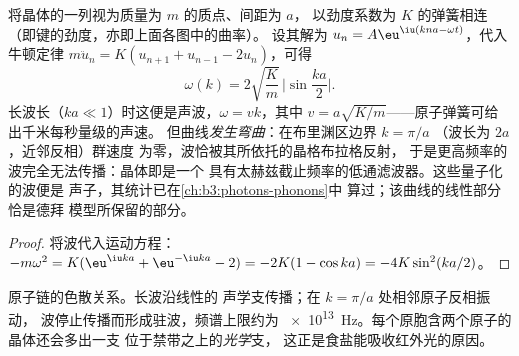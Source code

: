 \begin{theorem}[单原子链的色散]\label{thm:b3:crystalline-solids:dispersion}
将晶体的一列视为质量为 $m$ 的质点、间距为 $a$，
以劲度系数为 $K$ 的弹簧相连（即键的劲度，亦即上面各图中的曲率）。
设其解为 $u_n = A\eu^{\iu(kna - \omega t)}$，代入牛顿定律
$m\ddot u_n = K(u_{n+1} + u_{n-1} - 2u_n)$，可得
\[
\omega(k) = 2\sqrt{\frac{K}{m}}\,\Big|\sin\frac{ka}{2}\Big| .
\]
长波长（$ka \ll 1$）时这便是声波，$\omega = vk$，其中
$v = a\sqrt{K/m}$——原子弹簧可给出千米每秒量级的声速。
但曲线\emph{发生弯曲}：在布里渊区边界 $k = \pi/a$
（波长为 $2a$，近邻反相）群速度
为零，波恰被其所依托的晶格布拉格反射，
于是更高频率的波完全无法传播：晶体即是一个
具有太赫兹截止频率的低通滤波器。这些量子化的波便是
声子，其统计已在\cref{ch:b3:photons-phonons}中
算过；该曲线的线性部分恰是德拜
模型所保留的部分。
\end{theorem}

\begin{proof}
将波代入运动方程：$-m\omega^2 =
K(\eu^{\iu ka} + \eu^{-\iu ka} - 2) = -2K(1 - \cos ka) =
-4K\sin^2(ka/2)$。
\end{proof}

\begin{omfigure}

{\small 原子链的色散关系。长波沿线性的
声学支传播；在 $k = \pi/a$ 处相邻原子反相振动，
波停止传播而形成驻波，频谱上限约为
\qty{e13}{Hz}。每个原胞含两个原子的晶体还会多出一支
位于禁带之上的\emph{光学}支，
这正是食盐能吸收红外光的原因。}
\end{omfigure}

